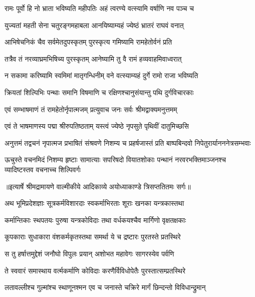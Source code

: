 \twolineshloka
{रामः पूर्वो हि नो भ्राता भविष्यति महीपतिः}
{अहं त्वरण्ये वत्स्यामि वर्षाणि नव पञ्च च} %

\twolineshloka
{युज्यतां महती सेना चतुरङ्गमहाबला}
{आनयिष्याम्यहं ज्येष्ठं भ्रातरं राघवं वनात्} %

\twolineshloka
{आभिषेचनिकं चैव सर्वमेतदुपस्कृतम्}
{पुरस्कृत्य गमिष्यामि रामहेतोर्वनं प्रति} %

\twolineshloka
{तत्रैव तं नरव्याघ्रमभिषिच्य पुरस्कृतम्}
{आनेष्यामि तु वै रामं हव्यवाहमिवाध्वरात्} %

\twolineshloka
{न सकामा करिष्यामि स्वमिमां मातृगन्धिनीम्}
{वने वत्स्याम्यहं दुर्गे रामो राजा भविष्यति} %

\twolineshloka
{क्रियतां शिल्पिभिः पन्थाः समानि विषमाणि च}
{रक्षिणश्चानुसंयान्तु पथि दुर्गविचारकाः} %

\twolineshloka
{एवं सम्भाषमाणं तं रामहेतोर्नृपात्मजम्}
{प्रत्युवाच जनः सर्वः श्रीमद्वाक्यमनुत्तमम्} %

\twolineshloka
{एवं ते भाषमाणस्य पद्मा श्रीरुपतिष्ठताम्}
{यस्त्वं ज्येष्ठे नृपसुते पृथिवीं दातुमिच्छसि} %

\fourlineindentedshloka
{अनुत्तमं तद्वचनं नृपात्मज}
{प्रभाषितं संश्रवणे निशम्य च}
{प्रहर्षजास्तं प्रति बाष्पबिन्दवो}
{निपेतुरार्यानननेत्रसम्भवाः} %

\fourlineindentedshloka
{ऊचुस्ते वचनमिदं निशम्य हृष्टाः}
{सामात्याः सपरिषदो वियातशोकाः}
{पन्थानं नरवरभक्तिमाञ्जनश्च}
{व्यादिष्टस्तव वचनाच्च शिल्पिवर्गः} %


{॥इत्यार्षे श्रीमद्रामायणे वाल्मीकीये आदिकाव्ये अयोध्याकाण्डे त्रिसप्ततितमः सर्गः॥}


\twolineshloka
{अथ भूमिप्रदेशज्ञाः सूत्रकर्मविशारदाः}
{स्वकर्माभिरताः शूराः खनका यन्त्रकास्तथा} %

\twolineshloka
{कर्मान्तिकाः स्थपतयः पुरुषा यन्त्रकोविदाः}
{तथा वर्धकयश्चैव मार्गिणो वृक्षतक्षकाः} %

\twolineshloka
{कूपकाराः सुधाकारा वंशकर्मकृतस्तथा}
{समर्था ये च द्रष्टारः पुरतस्ते प्रतस्थिरे} %

\twolineshloka
{स तु हर्षात्तमुद्देशं जनौघो विपुलः प्रयान्}
{अशोभत महावेगः सागरस्येव पर्वणि} %

\twolineshloka
{ते स्ववारं समास्थाय वर्त्मकर्माणि कोविदाः}
{करणैर्विविधोपेतैः पुरस्तात्सम्प्रतस्थिरे} %

\twolineshloka
{लतावल्लीश्च गुल्मांश्च स्थाणूनश्मन एव च}
{जनास्ते चक्रिरे मार्गं छिन्दन्तो विविधान्द्रुमान्} %

